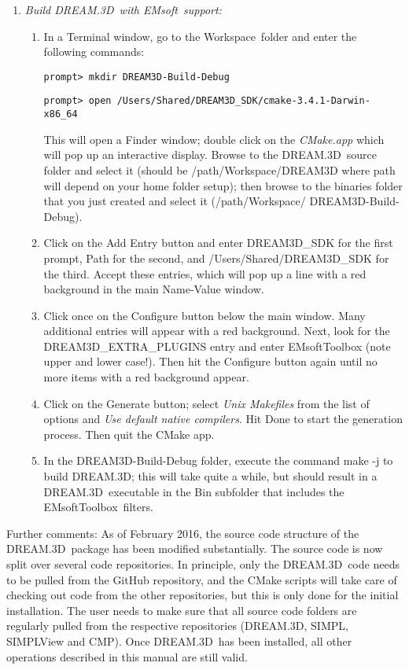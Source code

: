 \documentclass[11pt]{amsart}
\newcommand{\ems}{\textsf{EMsoft}}
\newcommand{\dtd}{\textsf{DREAM.3D}}
\newcommand{\emtb}{\textsf{EMsoftToolbox}}
\newcommand{\ws}{\textsf{Workspace}}
\begin{document}
\begin{enumerate}
\item \textit{Build \dtd\ with \ems\ support:}
\begin{enumerate}
\item In a Terminal window, go to the \ws\ folder and enter the following commands:
{\small\begin{verbatim}
prompt> mkdir DREAM3D-Build-Debug
\end{verbatim}}
{\small\begin{verbatim}
prompt> open /Users/Shared/DREAM3D_SDK/cmake-3.4.1-Darwin-x86_64
\end{verbatim}}
This will open a Finder window; double click on the \textit{CMake.app} which will pop up an interactive display.  Browse to the \dtd\ source folder
and select it (should be \textsf{/path/Workspace/DREAM3D} where \textsf{path} will depend on your home folder setup); then browse to
the binaries folder that you just created and select it (\textsf{/path/Workspace/ DREAM3D-Build-Debug}).
\item Click on the \textsf{Add Entry} button and enter \textsf{DREAM3D\_SDK} for the first prompt, \textsf{Path} for the second, and \textsf{/Users/Shared/DREAM3D\_SDK}
for the third.  Accept these entries, which will pop up a line with a red background in the main Name-Value window.
\item Click once on the \textsf{Configure} button below the main window.  Many additional entries will appear with a red background.  Next,
look for the \textsf{DREAM3D\_EXTRA\_PLUGINS} entry and enter \textsf{EMsoftToolbox} (note upper and lower case!).  Then hit the \textsf{Configure}
button again until no more items with a red background appear.
\item Click on the \textsf{Generate} button; select \textit{Unix Makefiles} from the list of options and  \textit{Use default native compilers}.  
Hit Done to start the generation process.  Then quit the CMake app.
\item In the \textsf{DREAM3D-Build-Debug} folder, execute the command \textsf{make -j} to build \dtd; this will take quite a while, but should result in 
a \dtd\ executable in the \textsf{Bin} subfolder that includes the \emtb\ filters.
\end{enumerate}

\end{enumerate}

Further comments: As of February 2016, the source code structure of the \dtd\ package has been modified substantially. The source code is 
now split over several code repositories.  In principle, only the \dtd\ code needs to be pulled from the GitHub repository, and the CMake 
scripts will take care of checking out code from the other repositories, but this is only done for the initial installation.  The user needs 
to make sure that all source code folders are regularly pulled from the respective repositories (\dtd, \textsf{SIMPL}, \textsf{SIMPLView} and \textsf{CMP}).
Once \dtd\ has been installed, all other operations described in this manual are still valid.
\end{document}
